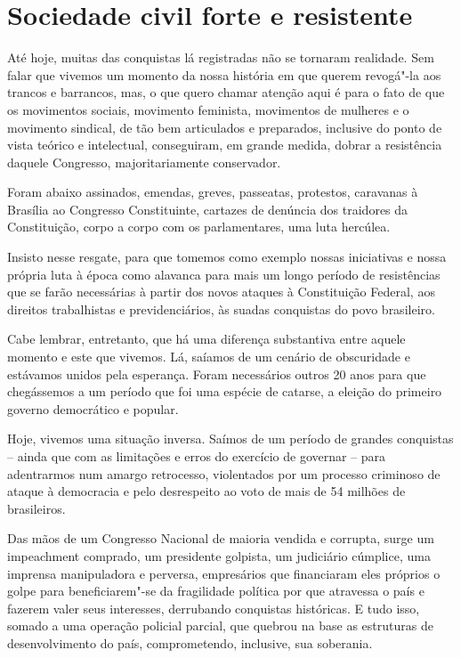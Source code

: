 \section{Sociedade civil forte e resistente}

Até hoje, muitas das conquistas lá registradas não se tornaram
realidade. Sem falar que vivemos um momento da nossa história em que
querem revogá"-la aos trancos e barrancos, mas, o que quero chamar
atenção aqui é para o fato de que os movimentos sociais, movimento
feminista, movimentos de mulheres e o movimento sindical, de tão bem
articulados e preparados, inclusive do ponto de vista teórico e
intelectual, conseguiram, em grande medida, dobrar a resistência daquele
Congresso, majoritariamente conservador.

Foram abaixo assinados, emendas, greves, passeatas, protestos, caravanas
à Brasília ao Congresso Constituinte, cartazes de denúncia dos traidores
da Constituição, corpo a corpo com os parlamentares, uma luta hercúlea.

Insisto nesse resgate, para que tomemos como exemplo nossas iniciativas
e nossa própria luta à época como alavanca para mais um longo período de
resistências que se farão necessárias à partir dos novos ataques à
Constituição Federal, aos direitos trabalhistas e previdenciários, às
suadas conquistas do povo brasileiro.

Cabe lembrar, entretanto, que há uma diferença substantiva entre aquele
momento e este que vivemos. Lá, saíamos de um cenário de obscuridade e
estávamos unidos pela esperança. Foram necessários outros 20 anos para
que chegássemos a um período que foi uma espécie de catarse, a eleição
do primeiro governo democrático e popular.

Hoje, vivemos uma situação inversa. Saímos de um período de grandes
conquistas -- ainda que com as limitações e erros do exercício de
governar -- para adentrarmos num amargo retrocesso, violentados por um
processo criminoso de ataque à democracia e pelo desrespeito ao voto de
mais de 54 milhões de brasileiros.

Das mãos de um Congresso Nacional de maioria vendida e corrupta, surge
um impeachment comprado, um presidente golpista, um judiciário cúmplice,
uma imprensa manipuladora e perversa, empresários que financiaram eles
próprios o golpe para beneficiarem"-se da fragilidade política por que
atravessa o país e fazerem valer seus interesses, derrubando conquistas
históricas. E tudo isso, somado a uma operação policial parcial, que
quebrou na base as estruturas de desenvolvimento do país, comprometendo,
inclusive, sua soberania.

